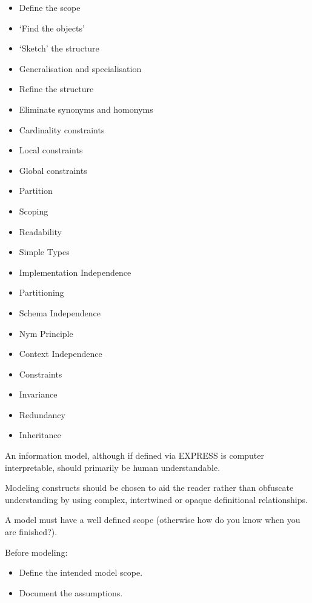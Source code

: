 
\begin{itemize}
\item Define the scope
\item `Find the objects'
\item `Sketch' the structure
\item Generalisation and specialisation
\item Refine the structure
\item Eliminate synonyms and homonyms
\item Cardinality constraints
\item Local constraints
\item Global constraints
\item Partition
\end{itemize}


\begin{itemize}
\item Scoping
\item Readability
\item Simple Types
\item Implementation Independence
\item Partitioning
\item Schema Independence
\item Nym Principle
\item Context Independence
\item Constraints
\item Invariance
\item Redundancy
\item Inheritance
\end{itemize}


    An information model, although if defined via EXPRESS is computer
interpretable, should primarily be human understandable.

    Modeling constructs should be chosen to aid the reader rather
than obfuscate understanding by using complex, intertwined or
opaque definitional relationships.


    A model must have a well defined scope (otherwise how do you know
when you are finished?).

    Before modeling:
\begin{itemize}
\item Define the intended model scope.
\item Document the assumptions.
\end{itemize}

